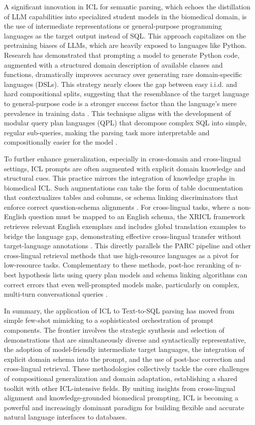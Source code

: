 \documentclass[11pt]{article}
\begin{document}
A significant innovation in ICL for semantic parsing, which echoes the distillation of LLM capabilities into specialized student models in the biomedical domain, is the use of intermediate representations or general-purpose programming languages as the target output instead of SQL. This approach capitalizes on the pretraining biases of LLMs, which are heavily exposed to languages like Python. Research has demonstrated that prompting a model to generate Python code, augmented with a structured domain description of available classes and functions, dramatically improves accuracy over generating rare domain-specific languages (DSLs). This strategy nearly closes the gap between easy i.i.d. and hard compositional splits, suggesting that the resemblance of the target language to general-purpose code is a stronger success factor than the language's mere prevalence in training data \cite{ref528}. This technique aligns with the development of modular query plan languages (QPL) that decompose complex SQL into simple, regular sub-queries, making the parsing task more interpretable and compositionally easier for the model \cite{ref529}.

To further enhance generalization, especially in cross-domain and cross-lingual settings, ICL prompts are often augmented with explicit domain knowledge and structural cues. This practice mirrors the integration of knowledge graphs in biomedical ICL. Such augmentations can take the form of table documentation that contextualizes tables and columns, or schema linking discriminators that enforce correct question-schema alignments \cite{ref530,ref531}. For cross-lingual tasks, where a non-English question must be mapped to an English schema, the XRICL framework retrieves relevant English exemplars and includes global translation examples to bridge the language gap, demonstrating effective cross-lingual transfer without target-language annotations \cite{ref532}. This directly parallels the PARC pipeline and other cross-lingual retrieval methods that use high-resource languages as a pivot for low-resource tasks. Complementary to these methods, post-hoc reranking of n-best hypothesis lists using query plan models and schema linking algorithms can correct errors that even well-prompted models make, particularly on complex, multi-turn conversational queries \cite{ref533}.

In summary, the application of ICL to Text-to-SQL parsing has moved from simple few-shot mimicking to a sophisticated orchestration of prompt components. The frontier involves the strategic synthesis and selection of demonstrations that are simultaneously diverse and syntactically representative, the adoption of model-friendly intermediate target languages, the integration of explicit domain schema into the prompt, and the use of post-hoc correction and cross-lingual retrieval. These methodologies collectively tackle the core challenges of compositional generalization and domain adaptation, establishing a shared toolkit with other ICL-intensive fields. By uniting insights from cross-lingual alignment and knowledge-grounded biomedical prompting, ICL is becoming a powerful and increasingly dominant paradigm for building flexible and accurate natural language interfaces to databases.
\end{document}
